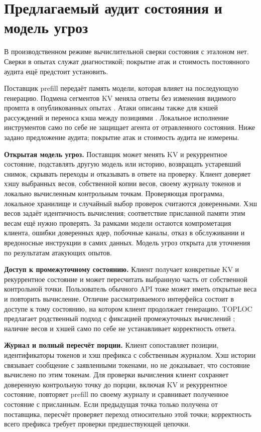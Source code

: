 \section{Предлагаемый аудит состояния и модель угроз}
\label{sec:security}

В производственном режиме вычислительной сверки состояния с эталоном нет.
Сверки в опытах служат диагностикой; покрытие атак и стоимость постоянного аудита ещё предстоит установить.


Поставщик prefill передаёт память модели, которая влияет на последующую генерацию. Подмена сегментов KV
меняла ответы без изменения видимого промпта в опубликованных опытах \cite{ganesh2025historyswap}.
Атаки описаны также для кэшей рассуждений и переноса кэша между позициями
\cite{zhu2026r2ecap,zhang2026hijackkv}. Локальное исполнение инструментов само по себе не защищает
агента от отравленного состояния. Ниже задано предложение аудита; покрытие атак и стоимость аудита не измерены.

\textbf{Открытая модель угроз.} Поставщик может менять KV и рекуррентное состояние, подставлять другую модель
или историю, возвращать устаревший снимок, скрывать переходы и отказывать в ответе на проверку.
Клиент доверяет хэшу выбранных весов, собственной копии весов, своему журналу токенов и локально вычисленным
контрольным точкам. Проверяющая программа, локальное хранилище и случайный выбор проверок считаются доверенными.
Хэш весов задаёт идентичность вычисления; соответствие присланной памяти этим весам ещё нужно проверять.
За рамками модели остаются компрометация клиента, ошибки доверенных ядер, побочные каналы, отказ в обслуживании
и вредоносные инструкции в самих данных. Модель угроз открыта для уточнения по результатам атакующих опытов.

\textbf{Доступ к промежуточному состоянию.} Клиент получает конкретные KV и рекуррентное состояние и может
пересчитать выбранную часть от собственной контрольной точки. Пользователь обычного API тоже может иметь
открытые веса и повторить вычисление. Отличие рассматриваемого интерфейса состоит в доступе к тому состоянию,
на котором клиент продолжает генерацию. TOPLOC предлагает родственный подход с фиксацией промежуточных
вычислений \cite{ong2025toploc}; наличие весов и хэшей само по себе не устанавливает корректность ответа.

\textbf{Журнал и полный пересчёт порции.} Клиент сопоставляет позиции, идентификаторы токенов и хэш префикса
с собственным журналом. Хэш истории связывает сообщение с заявленными токенами, но не доказывает, что состояние
вычислено по этим токенам. Для проверки вычисления клиент сохраняет доверенную контрольную точку до порции,
включая KV и рекуррентное состояние, повторяет prefill по своему журналу и сравнивает полученное состояние
с присланным. Если предыдущая точка только получена от поставщика, пересчёт проверяет переход относительно
этой точки; корректность всего префикса требует проверки предшествующей цепочки.


